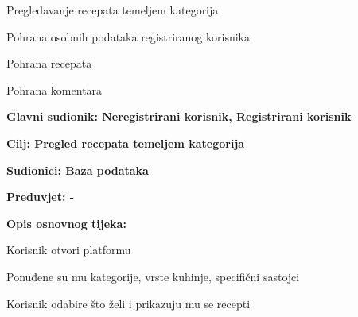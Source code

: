 \begin{packed_enum}
		\item  {}
		
		\begin{packed_enum}
			
			\item Pregledavanje recepata temeljem kategorija
			
		\end{packed_enum}
		
		
		\item  {}
		
		\begin{packed_enum}
			
			\item Pohrana osobnih podataka registriranog korisnika
			\item Pohrana recepata
			\item Pohrana komentara
			
		\end{packed_enum}
	\end{packed_enum}
	
	\eject 
	
	
	\noindent {}
	\begin{packed_item}
		
		\item \textbf{Glavni sudionik: Neregistrirani korisnik, Registrirani korisnik}
		\item  \textbf{Cilj: Pregled recepata temeljem kategorija} 
		\item  \textbf{Sudionici: Baza podataka} 
		\item  \textbf{Preduvjet: -} 
		\item  \textbf{Opis osnovnog tijeka:}
		
		\item[] \begin{packed_enum}
			
			\item Korisnik otvori platformu
			\item Ponuđene su mu kategorije, vrste kuhinje, specifični sastojci
			\item Korisnik odabire što želi i prikazuju mu se recepti
		\end{packed_enum}
		
	\end{packed_item}
	
